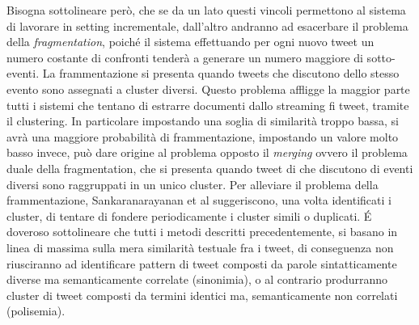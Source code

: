 Bisogna sottolineare però, che se da un lato questi vincoli permettono al sistema di lavorare in setting incrementale, dall'altro andranno ad esacerbare il problema della \emph{fragmentation}, poiché il sistema effettuando per ogni nuovo tweet un numero costante di confronti tenderà a generare un numero maggiore di sotto-eventi. La frammentazione si presenta quando tweets che discutono dello stesso evento sono assegnati a cluster diversi. Questo problema affligge la maggior parte tutti i sistemi che tentano di estrarre documenti dallo streaming fi tweet, tramite il clustering. In particolare impostando una soglia di similarità troppo bassa, si avrà una maggiore probabilità di frammentazione, impostando un valore molto basso invece, può dare origine al problema opposto il \emph{merging} ovvero il problema duale della fragmentation, che si presenta quando tweet di che discutono di eventi diversi sono raggruppati in un unico cluster. Per alleviare il problema della frammentazione, Sankaranarayanan et al \cite{Sankaranarayanan:2009:TNT:1653771.1653781} suggeriscono, una volta identificati i cluster, di tentare di fondere periodicamente i cluster simili o duplicati. \'E doveroso sottolineare che tutti i metodi descritti precedentemente, si basano in linea di massima   sulla mera similarità testuale fra i tweet,  di conseguenza non riusciranno ad identificare pattern di tweet composti da parole sintatticamente diverse ma  semanticamente correlate (sinonimia), o al contrario produrranno cluster di tweet composti da termini identici ma, semanticamente non correlati (polisemia).


